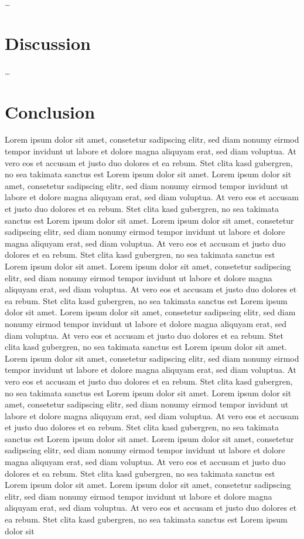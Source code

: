 \dots

\chapter{Discussion}
\label{ch:Discussion}

\dots

\chapter{Conclusion}
\label{ch:Conclusion}

Lorem ipsum dolor sit amet, consetetur sadipscing elitr, sed diam nonumy eirmod tempor invidunt ut labore et dolore magna aliquyam erat, sed diam voluptua. At vero eos et accusam et justo duo dolores et ea rebum. Stet clita kasd gubergren, no sea takimata sanctus est Lorem ipsum dolor sit amet. Lorem ipsum dolor sit amet, consetetur sadipscing elitr, sed diam nonumy eirmod tempor invidunt ut labore et dolore magna aliquyam erat, sed diam voluptua. At vero eos et accusam et justo duo dolores et ea rebum. Stet clita kasd gubergren, no sea takimata sanctus est Lorem ipsum dolor sit amet. Lorem ipsum dolor sit amet, consetetur sadipscing elitr, sed diam nonumy eirmod tempor invidunt ut labore et dolore magna aliquyam erat, sed diam voluptua. At vero eos et accusam et justo duo dolores et ea rebum. Stet clita kasd gubergren, no sea takimata sanctus est Lorem ipsum dolor sit amet. Lorem ipsum dolor sit amet, consetetur sadipscing elitr, sed diam nonumy eirmod tempor invidunt ut labore et dolore magna aliquyam erat, sed diam voluptua. At vero eos et accusam et justo duo dolores et ea rebum. Stet clita kasd gubergren, no sea takimata sanctus est Lorem ipsum dolor sit amet. Lorem ipsum dolor sit amet, consetetur sadipscing elitr, sed diam nonumy eirmod tempor invidunt ut labore et dolore magna aliquyam erat, sed diam voluptua. At vero eos et accusam et justo duo dolores et ea rebum. Stet clita kasd gubergren, no sea takimata sanctus est Lorem ipsum dolor sit amet. Lorem ipsum dolor sit amet, consetetur sadipscing elitr, sed diam nonumy eirmod tempor invidunt ut labore et dolore magna aliquyam erat, sed diam voluptua. At vero eos et accusam et justo duo dolores et ea rebum. Stet clita kasd gubergren, no sea takimata sanctus est Lorem ipsum dolor sit amet. Lorem ipsum dolor sit amet, consetetur sadipscing elitr, sed diam nonumy eirmod tempor invidunt ut labore et dolore magna aliquyam erat, sed diam voluptua. At vero eos et accusam et justo duo dolores et ea rebum. Stet clita kasd gubergren, no sea takimata sanctus est Lorem ipsum dolor sit amet. Lorem ipsum dolor sit amet, consetetur sadipscing elitr, sed diam nonumy eirmod tempor invidunt ut labore et dolore magna aliquyam erat, sed diam voluptua. At vero eos et accusam et justo duo dolores et ea rebum. Stet clita kasd gubergren, no sea takimata sanctus est Lorem ipsum dolor sit amet. Lorem ipsum dolor sit amet, consetetur sadipscing elitr, sed diam nonumy eirmod tempor invidunt ut labore et dolore magna aliquyam erat, sed diam voluptua. At vero eos et accusam et justo duo dolores et ea rebum. Stet clita kasd gubergren, no sea takimata sanctus est Lorem ipsum dolor sit 